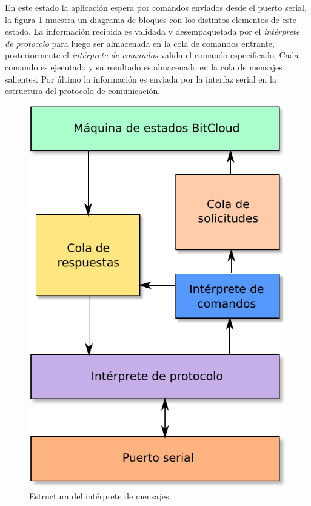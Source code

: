 En este estado la aplicación espera por comandos enviados desde el puerto serial, la figura \ref{fig:interprete_mensajes} muestra un diagrama de bloques con los distintos elementos de este estado. La información recibida es validada y desempaquetada por el \textit{intérprete de protocolo} para luego ser almacenada en la cola de comandos entrante, posteriormente el \textit{intérprete de comandos} valida el comando especificado. Cada comando es ejecutado y su resultado es almacenado en la cola de mensajes salientes. Por último la información es enviada por la interfaz serial en la estructura del protocolo de comunicación.  

\begin{figure}
	\centering
	\includegraphics[scale=0.5]{capitulo_3_imgs/estructura_interprete.pdf}
	\caption{Estructura del intérprete de mensajes}
	\label{fig:interprete_mensajes}
\end{figure}


